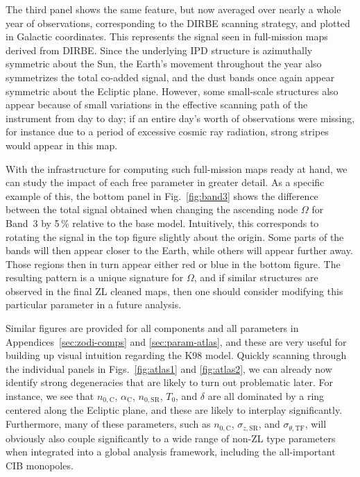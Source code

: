 \documentclass[twocolumn]{aa}
\begin{document}
The third panel shows the same feature, but now averaged over nearly
a whole year of observations, corresponding to the DIRBE scanning 
strategy, and plotted in Galactic coordinates. This
represents the signal seen in full-mission maps derived from
DIRBE. Since the underlying IPD structure is azimuthally symmetric
about the Sun, the Earth's movement throughout the year also
symmetrizes the total co-added signal, and the dust bands once again
appear symmetric about the Ecliptic plane. However, some small-scale
structures also appear because of small variations in the effective
scanning path of the instrument from day to day; if an entire day's
worth of observations were missing, for instance due to a period of
excessive cosmic ray radiation, strong stripes would appear in this
map.

With the infrastructure for computing such full-mission maps ready at
hand, we can study the impact of each free parameter in greater
detail. As a specific example of this, the bottom panel in
Fig.~\ref{fig:band3} shows the difference between the total signal
obtained when changing the ascending node $\Omega$ for Band~3 by 5\,\%
relative to the base model. Intuitively, this corresponds to rotating
the signal in the top figure slightly about the origin. Some parts of
the bands will then appear closer to the Earth, while others will
appear further away. Those regions then in turn appear either red or
blue in the bottom figure. The resulting pattern is a unique
signature for $\Omega$, and if similar structures are observed in the
final ZL cleaned maps, then one should consider modifying this
particular parameter in a future analysis.

Similar figures are provided for all components and all parameters in
Appendices~\ref{sec:zodi-comps} and \ref{sec:param-atlas}, and these
are very useful for building up visual intuition regarding the K98
model. Quickly scanning through the individual panels in
Figs.~\ref{fig:atlas1} and \ref{fig:atlas2}, we can already now
identify strong degeneracies that are likely to turn out problematic
later. For instance, we see that $n_{0,\mathrm{C}}$,
$\alpha_\mathrm{C}$, $n_{0,\mathrm{SR}}$, $T_0$, and $\delta$ are all
dominated by a ring centered along the Ecliptic plane, and these are
likely to interplay significantly. Furthermore, many of these
parameters, such as $n_{0,\mathrm{C}}$, $\sigma_{z,\mathrm{SR}}$, and
$\sigma_{\theta,\mathrm{TF}}$, will obviously also couple
significantly to a wide range of non-ZL type parameters when
integrated into a global analysis framework, including the
all-important CIB monopoles.
\end{document}
